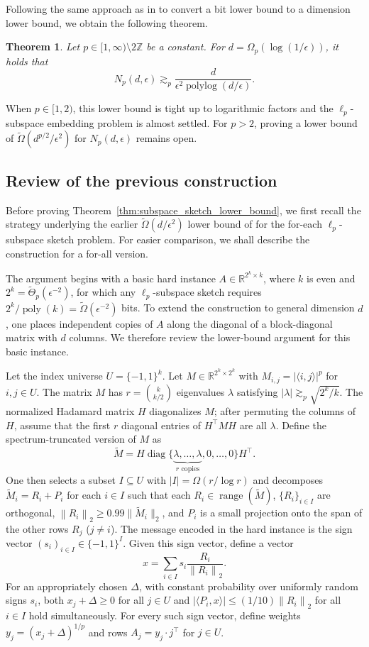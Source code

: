 \documentclass[11pt]{article}
\newtheorem{theorem}{Theorem}[section]
\theoremstyle{remark}
\theoremstyle{definition}
\newcommand{\R}{\mathbb{R}}
\newcommand{\eps}{\epsilon}
\newcommand{\norm}[1]{\left\|#1\right\|}
\DeclareMathOperator{\poly}{poly}
\DeclareMathOperator{\polylog}{polylog}
\DeclareMathOperator{\range}{range}
\DeclareMathOperator{\diag}{diag}
\begin{document}
Following the same approach as in \cite{LWW21} to convert a bit lower bound to a dimension lower bound, we obtain the following theorem.
\begin{theorem}\label{thm:dimension_lower_bound}
	Let $p\in [1, \infty) \setminus 
	2\mathbb{Z}$ be a constant.
	For $d=\Omega_p(\log(1/\eps))$, it holds that
	\[
		N_p(d,\epsilon) \gtrsim_{p} \frac{d}{\eps^2 \polylog(d/\eps)}.
	\]
\end{theorem}
When $p\in [1,2)$, this lower bound is tight up to logarithmic factors and the $\ell_p$-subspace embedding problem is almost settled. For $p>2$, proving a lower bound of $\widetilde{\Omega}(d^{p/2}/\eps^2)$ for $N_p(d,\eps)$ remains open.

\subsection{Review of the previous construction}
Before proving Theorem~\ref{thm:subspace_sketch_lower_bound}, we first recall the strategy underlying the earlier $\tilde{\Omega}(d/\eps^2)$ lower bound of \cite{LWW21} for the for-each $\ell_p$-subspace sketch problem. For easier comparison, we shall describe the construction for a for-all version.

The argument begins with a basic hard instance $A\in \R^{2^k\times k}$, where $k$ is even and $2^k=\widetilde{\Theta}_p(\eps^{-2})$, for which any $\ell_p$-subspace sketch requires $2^k/\poly(k) = \tilde{\Omega}(\eps^{-2})$ bits. To extend the construction to general dimension $d$, one places independent copies of $A$ along the diagonal of a block-diagonal matrix with $d$ columns. We therefore review the lower-bound argument for this basic instance.

Let the index universe $U = \{-1,1\}^k$. Let $M\in\R^{2^k\times 2^k}$ with $M_{i,j} = |\langle i,j\rangle|^p$ for $i,j\in U$.  The matrix $M$ has $r = \binom{k}{k/2}$ eigenvalues $\lambda$ satisfying $|\lambda| \gtrsim_p \sqrt{2^k/k}$. The normalized Hadamard matrix $H$ diagonalizes $M$; after permuting the columns of $H$, assume that the first $r$ diagonal entries of
$H^\top MH$ are all $\lambda$. Define the spectrum-truncated version of $M$ as
\[
	\widetilde{M} = H \diag\{\underbrace{\lambda,\dots,\lambda}_{r\text{ copies}},0,\dots,0\} H^\top.
\]
One then selects a subset $I\subseteq U$ with $|I| = \Omega(r/\log r)$ and decomposes $\widetilde{M}_i = R_i + P_i$ for each $i\in I$ such that each $R_i\in\range(\widetilde{M})$, $\{R_i\}_{i\in I}$ are orthogonal, $\norm{R_i}_2\geq 0.99\|\widetilde{M}_i\|_2$, and $P_i$ is a small projection onto the span of the other rows $R_j$ ($j\neq i$).
The message encoded in the hard instance is the sign vector $(s_i)_{i\in I}\in\{-1,1\}^I$. Given this sign vector, define a vector 
\begin{equation}\label{eqn:old_x}
	x = \sum_{i\in I} s_i \frac{R_i}{\norm{R_i}_2}.
\end{equation}
For an appropriately chosen $\Delta$, with constant probability over uniformly random signs $s_i$, both $x_j+\Delta\geq 0$ for all $j\in U$ and
$|\langle P_i,x\rangle|\leq (1/10)\norm{R_i}_2$ for all $i\in I$ hold simultaneously. For every such sign vector, define weights $y_j=(x_j+\Delta)^{1/p}$ and rows $A_j=y_j\cdot j^\top$ for $j\in U$.
\end{document}
